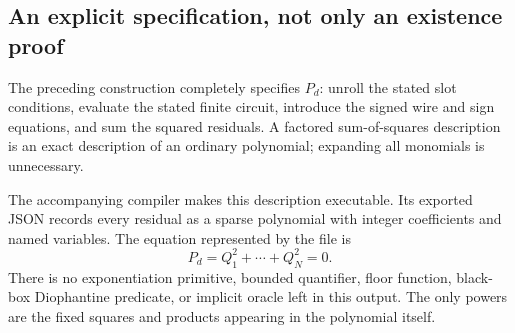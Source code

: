 \documentclass[11pt,a4paper]{article}
\theoremstyle{definition}
\theoremstyle{remark}
\begin{document}
\subsection{An explicit specification, not only an existence proof}
The preceding construction completely specifies $P_d$: unroll the stated
slot conditions, evaluate the stated finite circuit, introduce the signed
wire and sign equations, and sum the squared residuals. A factored
sum-of-squares description is an exact description of an ordinary
polynomial; expanding all monomials is unnecessary.

The accompanying compiler makes this description executable. Its exported
JSON records every residual as a sparse polynomial with integer
coefficients and named variables. The equation represented by the file is
\[
 P_d=Q_1^2+\cdots+Q_N^2=0.
\]
There is no exponentiation primitive, bounded quantifier, floor function,
black-box Diophantine predicate, or implicit oracle left in this output.
The only powers are the fixed squares and products appearing in the
polynomial itself.
\end{document}
